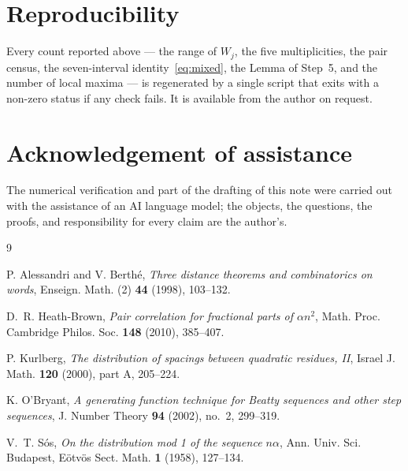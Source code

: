 \documentclass[11pt,reqno]{amsart}
\theoremstyle{plain}
\theoremstyle{remark}
\numberwithin{equation}{section}
\begin{document}
\section*{Reproducibility}

Every count reported above --- the range of $W_j$, the five multiplicities, the
pair census, the seven-interval identity~\eqref{eq:mixed}, the Lemma of Step~5,
and the number of local maxima --- is regenerated by a single script that exits
with a non-zero status if any check fails. It is available from the author on
request.

\section*{Acknowledgement of assistance}

The numerical verification and part of the drafting of this note were carried
out with the assistance of an AI language model; the objects, the questions, the
proofs, and responsibility for every claim are the author's.

\begin{thebibliography}{9}

P. Alessandri and V. Berth\'e,
\emph{Three distance theorems and combinatorics on words},
Enseign. Math. (2) \textbf{44} (1998), 103--132.

D.~R. Heath-Brown,
\emph{Pair correlation for fractional parts of $\alpha n^2$},
Math. Proc. Cambridge Philos. Soc. \textbf{148} (2010), 385--407.

P. Kurlberg,
\emph{The distribution of spacings between quadratic residues, II},
Israel J. Math. \textbf{120} (2000), part A, 205--224.

K. O'Bryant,
\emph{A generating function technique for Beatty sequences and other step
sequences},
J. Number Theory \textbf{94} (2002), no.~2, 299--319.

V.~T. S\'os,
\emph{On the distribution mod 1 of the sequence $n\alpha$},
Ann. Univ. Sci. Budapest, E\"otv\"os Sect. Math. \textbf{1} (1958), 127--134.

\end{thebibliography}
\end{document}
